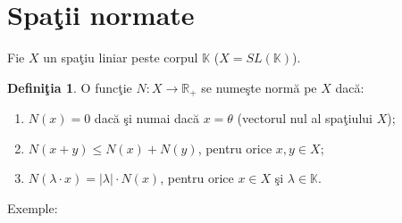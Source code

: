 \documentclass[ a4paper, 12pt]{report}
\theoremstyle{definition}
\newtheorem{definition}{\bf Defini\c tia}[section]
\theoremstyle{remark}
\numberwithin{equation}{section}
\begin{document}
\section{Spa\c tii normate}
Fie $X$ un spa\c tiu liniar peste corpul $\mathbb{K}$ ($X= SL(\mathbb{K})$).
\begin{definition}
O func\c tie $N : X \rightarrow \mathbb{R}_{+}$ se nume\c ste norm\u a pe $X$ dac\u a:
\begin{enumerate}[($n_1$)]
\item $N(x) = 0$ dac\u a \c si numai dac\u a $x = \theta$ (vectorul nul al spa\c tiului $X$);
\item $N(x + y) \leq N(x) + N(y)$, pentru orice $x,y \in X$;
\item $N(\lambda \cdot x) = \lvert \lambda\rvert \cdot N(x)$, pentru orice $x \in X$ \c si $\lambda \in \mathbb{K}$.
\end{enumerate}
\end{definition}
Exemple:
\end{document}

